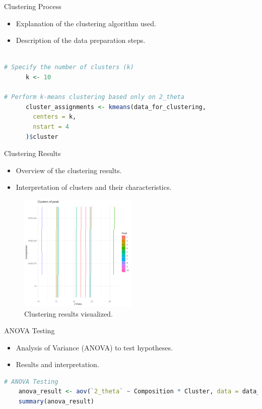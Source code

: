 \documentclass[aspectratio=169]{beamer}
\begin{document}
\begin{frame}[fragile]{Clustering Process}
    \begin{itemize}
        \item Explanation of the clustering algorithm used.
        \item Description of the data preparation steps.
    \end{itemize}

    \begin{lstlisting}[language=R, basicstyle=\small\ttfamily]
    
# Specify the number of clusters (k)
      k <- 10

# Perform k-means clustering based only on 2_theta
      cluster_assignments <- kmeans(data_for_clustering,
        centers = k,
        nstart = 4
      )$cluster

    \end{lstlisting}
\end{frame}

\begin{frame}{Clustering Results}
    \begin{itemize}
        \item Overview of the clustering results.
        \item Interpretation of clusters and their characteristics.
    \end{itemize}

    \begin{figure}
        \includegraphics[width=0.5\textwidth]{../plot/peak_clusters.png}
        \caption{Clustering results visualized.}
    \end{figure}
\end{frame}






\begin{frame}[fragile]{ANOVA Testing}
    \begin{itemize}
        \item Analysis of Variance (ANOVA) to test hypotheses.
        \item Results and interpretation.
    \end{itemize}

    \begin{lstlisting}[language=R]
    # ANOVA Testing
    anova_result <- aov(`2_theta` ~ Composition * Cluster, data = data_long)
    summary(anova_result)
    \end{lstlisting}
\end{frame}
\end{document}
